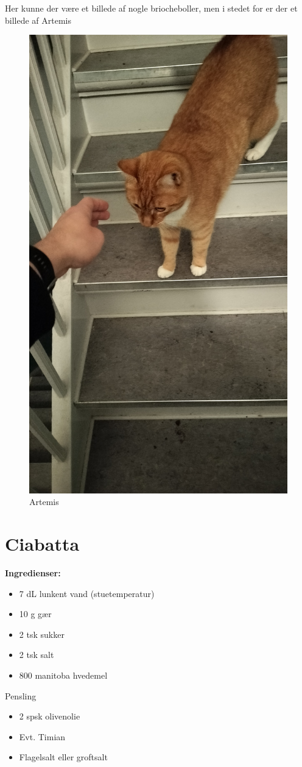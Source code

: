 \documentclass{book}
\begin{document}
\newpage Her kunne der være et billede af nogle briocheboller, men i stedet for er der et billede af Artemis
\begin{figure}
    \centering
    \includegraphics[width=0.5\linewidth]{IMG20231108195607.jpg}
    \caption{Artemis}
\end{figure}
\newpage \section{Ciabatta}
\begin{minipage}[t]{0.5\textwidth}
\textbf{Ingredienser:}
\begin{itemize}
    \item 7 dL lunkent vand (stuetemperatur)
    \item 10 g gær
    \item 2 tsk sukker
    \item 2 tsk salt
    \item 800 manitoba hvedemel
\end{itemize}
Pensling
\begin{itemize}
    \item 2 spsk olivenolie
    \item Evt. Timian
    \item Flagelsalt eller groftsalt
\end{itemize}
\end{minipage}
\end{document}
